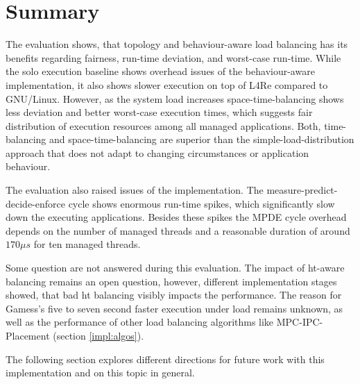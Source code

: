 \section{Summary}
\label{eval:summary}

The evaluation shows, that topology and behaviour-aware load balancing has its
benefits regarding fairness, run-time deviation, and worst-case run-time.
While the solo execution baseline shows overhead issues of the behaviour-aware
implementation, it also shows slower execution on top of L4Re compared to
GNU/Linux.
However, as the system load increases space-time-balancing shows less deviation
and better worst-case execution times, which suggests fair distribution of
execution resources among all managed applications.
Both, time-balancing and space-time-balancing are superior than the
simple-load-distribution approach that does not adapt to changing
circumstances or application behaviour.

The evaluation also raised issues of the implementation.
The measure-predict-decide-enforce cycle shows enormous run-time spikes, which
significantly slow down the executing applications.
Besides these spikes the MPDE cycle overhead depends on the number of managed
threads and a reasonable duration of around $170\mu{}s$ for ten managed
threads.

Some question are not answered during this evaluation.
The impact of \gls{ht}-aware balancing remains an open question, however,
different implementation stages showed, that bad \gls{ht} balancing visibly
impacts the performance.
The reason for Gamess's five to seven second faster execution under load
remains unknown, as well as the performance of other load balancing algorithms
like MPC-IPC-Placement (section \ref{impl:algos}).

The following section explores different directions for future work with this
implementation and on this topic in general.
